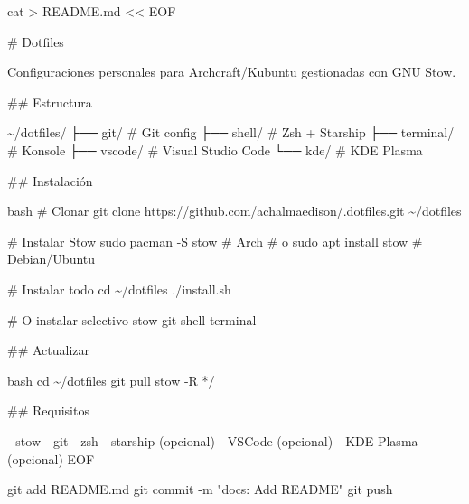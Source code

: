 \documentclass[
  doc,
  floatsintext,
  longtable,
  a4paper,
  nolmodern,
  notxfonts,
  notimes,
  12pt,
  colorlinks=true,linkcolor=blue,citecolor=blue,urlcolor=blue]{apa7}
\newenvironment{Shaded}{\begin{snugshade}}{\end{snugshade}}
\newcommand{\AttributeTok}[1]{\textcolor[rgb]{0.40,0.45,0.13}{#1}}
\newcommand{\FunctionTok}[1]{\textcolor[rgb]{0.28,0.35,0.67}{#1}}
\newcommand{\NormalTok}[1]{\textcolor[rgb]{0.00,0.23,0.31}{#1}}
\newcommand{\OperatorTok}[1]{\textcolor[rgb]{0.37,0.37,0.37}{#1}}
\newcommand{\StringTok}[1]{\textcolor[rgb]{0.13,0.47,0.30}{#1}}
\begin{document}
\begin{Shaded}
\begin{Highlighting}[]
\FunctionTok{cat} \OperatorTok{\textgreater{}}\NormalTok{ README.md }\OperatorTok{\textless{}\textless{} \textquotesingle{}EOF\textquotesingle{}}

\StringTok{\# Dotfiles}

\StringTok{Configuraciones personales para Archcraft/Kubuntu gestionadas con GNU Stow.}

\StringTok{\#\# Estructura}

\StringTok{\textasciigrave{}\textasciigrave{}}
\StringTok{\textasciitilde{}/dotfiles/}
\StringTok{├── git/          \# Git config}
\StringTok{├── shell/        \# Zsh + Starship}
\StringTok{├── terminal/     \# Konsole}
\StringTok{├── vscode/       \# Visual Studio Code}
\StringTok{└── kde/          \# KDE Plasma}
\StringTok{\textasciigrave{}\textasciigrave{}}

\StringTok{\#\# Instalación}

\StringTok{\textasciigrave{}\textasciigrave{}bash}
\StringTok{\# Clonar}
\StringTok{git clone https://github.com/achalmaedison/.dotfiles.git \textasciitilde{}/dotfiles}

\StringTok{\# Instalar Stow}
\StringTok{sudo pacman {-}S stow  \# Arch}
\StringTok{\# o}
\StringTok{sudo apt install stow  \# Debian/Ubuntu}

\StringTok{\# Instalar todo}
\StringTok{cd \textasciitilde{}/dotfiles}
\StringTok{./install.sh}

\StringTok{\# O instalar selectivo}
\StringTok{stow git shell terminal}
\StringTok{\textasciigrave{}\textasciigrave{}}

\StringTok{\#\# Actualizar}

\StringTok{\textasciigrave{}\textasciigrave{}bash}
\StringTok{cd \textasciitilde{}/dotfiles}
\StringTok{git pull}
\StringTok{stow {-}R */}
\StringTok{\textasciigrave{}\textasciigrave{}}

\StringTok{\#\# Requisitos}

\StringTok{{-} stow}
\StringTok{{-} git}
\StringTok{{-} zsh}
\StringTok{{-} starship (opcional)}
\StringTok{{-} VSCode (opcional)}
\StringTok{{-} KDE Plasma (opcional)}
\OperatorTok{EOF}

\FunctionTok{git}\NormalTok{ add README.md}
\FunctionTok{git}\NormalTok{ commit }\AttributeTok{{-}m} \StringTok{"docs: Add README"}
\FunctionTok{git}\NormalTok{ push}
\end{Highlighting}
\end{Shaded}
\end{document}

